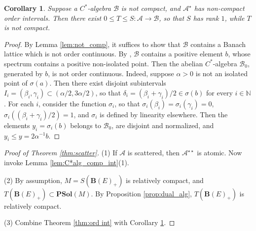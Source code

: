 \documentclass[12pt]{amsart}
\theoremstyle{plain}
\newtheorem{corollary}[theorem]{Corollary}
\theoremstyle{definition}
\renewcommand{\leq}{\leqslant}
\newcommand{\N}{\mathbb N}
\newcommand{\is}{\mathcal S}
\newcommand{\ball}{\mathbf{B}}
\newcommand{\A}{\mathcal{A}}
\newcommand{\psol}{\mathbf{PSol}}
\begin{document}
\begin{corollary}\label{cor:not_comp}
Suppose a $C^*$-algebra ${\mathcal{B}}$ is not compact,
and $\A^\star$ has non-compact order intervals. Then there exist
$0 \leq T \leq S : \A \to {\mathcal{B}}$,
so that $S$ has rank $1$, while $T$ is not compact.
\end{corollary}

\begin{proof}
By Lemma \ref{lem:not_comp}, it suffices to show that ${\mathcal{B}}$
contains a Banach lattice which is not order continuous.
By \cite[Exercise 4.7.20]{Dix}, ${\mathcal{B}}$ contains a positive
element $b$, whose spectrum contains a positive non-isolated point.
Then the abelian $C^*$-algebra ${\mathcal{B}}_0$, generated by $b$, is not order
continuous. Indeed, suppose $\alpha > 0$ is not an isolated point of
$\sigma(a)$. Then there exist disjoint subintervals
$I_i = (\beta_i,\gamma_i) \subset (\alpha/2, 3\alpha/2)$, so that
$\delta_i = (\beta_i + \gamma_i)/2 \in \sigma(b)$ for every $i \in \N$.
For each $i$, consider the function $\sigma_i$, so that
$\sigma_i(\beta_i) = \sigma_i(\gamma_i) = 0$,
$\sigma_i((\beta_i+\gamma_i)/2) = 1$, and $\sigma_i$
is defined by linearity elsewhere. Then the elements
$y_i = \sigma_i(b)$ belongs to ${\mathcal{B}}_0$, are
disjoint and normalized, and $y_i \leq y = 2 \alpha^{-1} b$.
\end{proof}


\begin{proof}[Proof of Theorem \ref{thm:scatter}]
(1) If $\A$ is scattered, then $\A^{\star\star}$ %
is atomic.
Now invoke Lemma \ref{lem:C*alg_comp_int}(1).

(2) By assumption, $M = S(\ball(E)_+)$ is relatively compact,
and $T(\ball(E)_+) \subset \psol(M)$. By Proposition \ref{prop:dual_alg},
$T(\ball(E)_+)$ is relatively compact.

(3) Combine Theorem \ref{thm:ord int} with
Corollary \ref{cor:not_comp}.
%
\end{proof}
\end{document}
